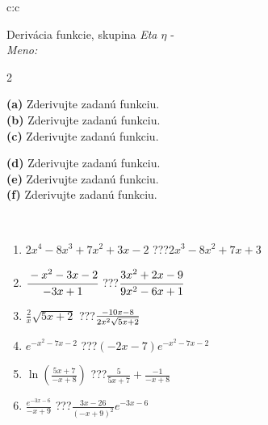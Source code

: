 \documentclass[10pt]{report}
\begin{document}
\newpage
\thispagestyle{empty}
\begin{tabular}{c:c}
\begin{minipage}[c][104.5mm][t]{0.5\linewidth}
\begin{center}
\vspace{7mm}
{\huge Derivácia funkcie, skupina \textit{Eta $\eta$} -}\\[5mm]
\textit{Meno:}\phantom{xxxxxxxxxxxxxxxxxxxxxxxxxxxxxxxxxxxxxxxxxxxxxxxxxxxxxxxxxxxxxxxxx}\\[5mm]
\begin{minipage}{0.95\linewidth}
\begin{center}
{\small \begin{multicols}{2} \raggedright
\textbf{(a)} Zderivujte zadanú funkciu. \\[1mm]
\textbf{(b)} Zderivujte zadanú funkciu. \\[1mm]
\textbf{(c)} Zderivujte zadanú funkciu. \par \columnbreak
\textbf{(d)} Zderivujte zadanú funkciu. \\[1mm]
\textbf{(e)} Zderivujte zadanú funkciu. \\[1mm]
\textbf{(f)} Zderivujte zadanú funkciu.
\end{multicols}
}
\end{center}
\end{minipage}
\\[4mm]
\begin{minipage}{0.79\linewidth}
\begin{center}
\begin{varwidth}{\linewidth}
\begin{enumerate}
\normalsize
\item $2x^4-8x^3+7x^2+3x-2$\quad \dotfill\; ???\;\dotfill \quad $2x^3-8x^2+7x+3$
\item $\cfrac{-x^2-3x-2}{-3x+1}$\quad \dotfill\; ???\;\dotfill \quad $\cfrac{3x^2+2x-9}{9x^2-6x+1}$
\item $\frac{2}{x}\sqrt{5x+2}$\quad \dotfill\; ???\;\dotfill \quad $\frac{-10x-8}{2x^2 \sqrt{\smash[b]{5x+2}}}$
\item $e^{-x^2-7x-2}$\quad \dotfill\; ???\;\dotfill \quad $(-2x-7)e^{-x^2-7x-2}$
\item $\ln{\left(\frac{5x+7}{-x+8}\right)}$\quad \dotfill\; ???\;\dotfill \quad $\frac{5}{5x+7}+\frac{-1}{-x+8}$
\item $\frac{e^{-3x-6}}{-x+9}$\quad \dotfill\; ???\;\dotfill \quad $\frac{3x-26}{(-x+9)^2}e^{-3x-6}$
\end{enumerate}

\end{varwidth}
\end{center}
\end{minipage}
\end{center}
\end{minipage}
\end{tabular}
\end{document}
